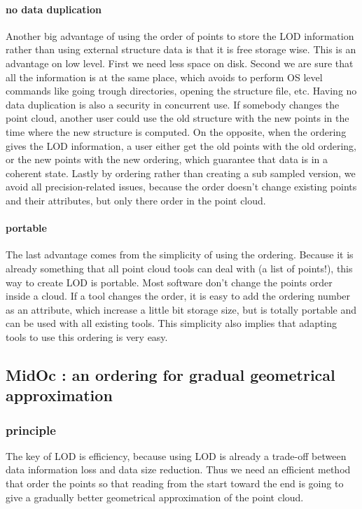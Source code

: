 			\paragraph{no data duplication}
				Another big advantage of using the order of points to store the LOD information rather than using external structure data is that it is free storage wise.
				This is an advantage on low level. First we need less space on disk. Second we are sure that all the information is at the same place, which avoids to perform OS level commands like going trough directories, opening the structure file, etc.
				Having no data duplication is also a security in concurrent use.
				If somebody changes the point cloud, another user could use the old structure with the new points in the time where the new structure is computed.
				On the opposite, when the ordering gives the LOD information, a user either get the old points with the old ordering, or the new points with the new ordering, which guarantee that data is in a coherent state.
				Lastly by ordering rather than creating a sub sampled version, we avoid all precision-related issues, because the order doesn't change existing points and their attributes, but only there order in the point cloud.
			\paragraph{portable}
				The last advantage comes from the simplicity of using the ordering. 
				Because it is already something that all point cloud tools can deal with (a list of points!), this way to create LOD is portable. Most software don't change the points order inside a cloud.
				If a tool changes the order, it is easy to add the ordering number as an attribute, which increase a little bit storage size, but is totally portable and can be used with all existing tools.
				This simplicity also implies that adapting tools to use this ordering is very easy.
	
	\subsection{MidOc : an ordering for gradual geometrical approximation}
		\subsubsection{principle}
			The key of LOD is efficiency, because using LOD is already a trade-off between data information loss and data size reduction.
			Thus we need an efficient method that order the points so that reading from the start toward the end is going to give a gradually better geometrical approximation of the point cloud.
			
